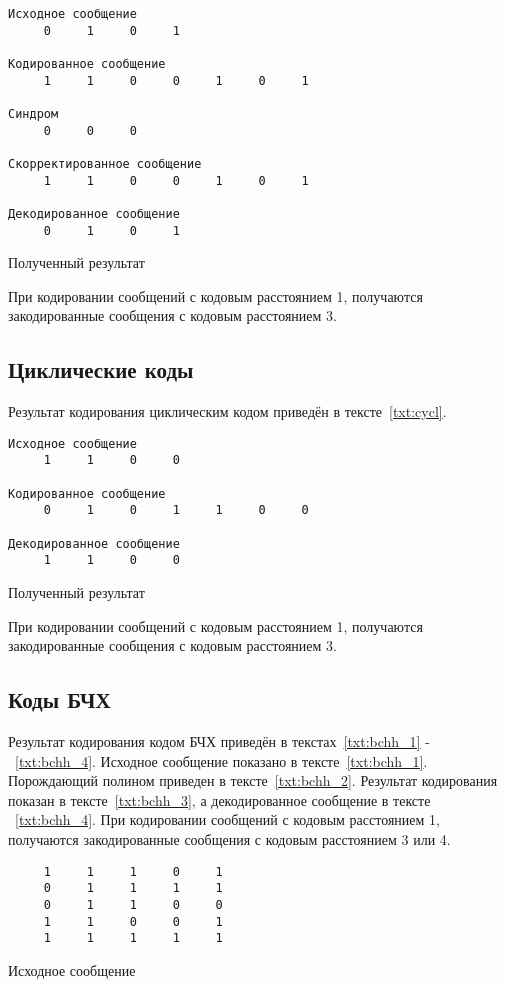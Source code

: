 \begin{program}
\begin{verbatim}
Исходное сообщение
     0     1     0     1

Кодированное сообщение
     1     1     0     0     1     0     1

Синдром
     0     0     0

Скорректированное сообщение
     1     1     0     0     1     0     1

Декодированное сообщение
     0     1     0     1
\end{verbatim}
\caption{Полученный результат}
\label{txt:ham_3}
\end{program}

При кодировании сообщений с кодовым расстоянием 1, получаются закодированные сообщения с кодовым расстоянием 3.

\subsection{Циклические коды}

Результат кодирования циклическим кодом приведён в тексте~\ref{txt:cycl}.


\begin{program}
\begin{verbatim}
Исходное сообщение
     1     1     0     0

Кодированное сообщение
     0     1     0     1     1     0     0

Декодированное сообщение
     1     1     0     0
\end{verbatim}
\caption{Полученный результат}
\label{txt:cycl}
\end{program}

При кодировании сообщений с кодовым расстоянием 1, получаются закодированные сообщения с кодовым расстоянием 3.


\subsection{Коды БЧХ}

Результат кодирования кодом БЧХ приведён в текстах~\ref{txt:bchh_1} - ~\ref{txt:bchh_4}.
Исходное сообщение показано в тексте~\ref{txt:bchh_1}. Порождающий полином приведен в тексте~\ref{txt:bchh_2}.
Результат кодирования показан в тексте~\ref{txt:bchh_3}, а декодированное сообщение в тексте ~\ref{txt:bchh_4}.
При кодировании сообщений с кодовым расстоянием 1, получаются закодированные сообщения с кодовым расстоянием 3 или 4.
\begin{program}
\begin{verbatim}
     1     1     1     0     1
     0     1     1     1     1
     0     1     1     0     0
     1     1     0     0     1
     1     1     1     1     1
\end{verbatim}
\caption{Исходное сообщение}
\label{txt:bchh_1}
\end{program}

